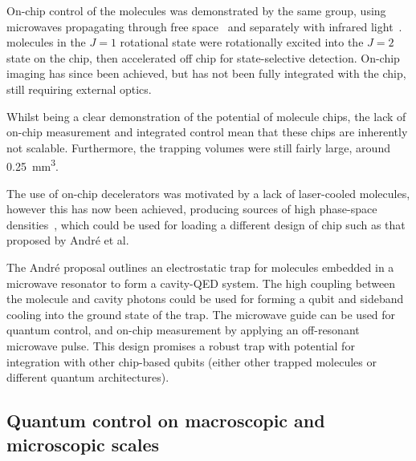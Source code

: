 On-chip control of the molecules was demonstrated by the same group, using
microwaves propagating through free space~\cite{doi:10.1002/cphc.201001007} and
separately with infrared light~\cite{doi:10.1080/00268976.2012.683885}.  \CO{}
molecules in the $J=1$ rotational state were rotationally excited into the $J=2$
state on the chip, then accelerated off chip for state-selective detection.
On-chip imaging has since been achieved, but has not been fully integrated with
the chip, still requiring external optics.~\cite{Marx2013}

Whilst being a clear demonstration of the potential of
molecule chips, the lack of on-chip measurement and integrated control mean that
these chips are inherently not scalable.  Furthermore, the trapping volumes were
still fairly large, around \SI{0.25}{\milli\metre\cubed}. 
%

%
The use of on-chip decelerators was motivated by a lack of laser-cooled
molecules, however this has now been achieved, producing sources of high
phase-space densities~\cite{Truppe2017}, which could be used for loading a
different design of chip such as that proposed by Andr\'e et
al.~\cite{Andre2006}

The Andr\'e proposal outlines an electrostatic trap for molecules embedded in a
microwave resonator to form a cavity-QED system. The high coupling between the
molecule and cavity photons could be used for forming a qubit and sideband
cooling into the ground state of the trap. The microwave guide can be used for
quantum control, and on-chip measurement by applying an off-resonant microwave
pulse. This design promises a robust trap with potential for integration with
other chip-based qubits (either other trapped molecules or different quantum
architectures).

\subsection{Quantum control on macroscopic and microscopic scales}
\label{litrev:control}


